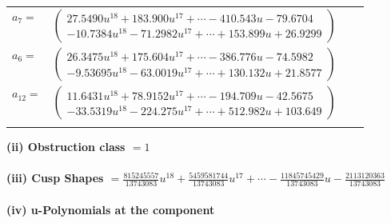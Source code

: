 \documentclass[1p]{elsarticle_modified}
\theoremstyle{definition}
\begin{document}
\begin{tabular}{m{7pt} m{180pt} m{7pt} m{180pt} }
\flushright $a_{7}=$&$\begin{pmatrix}27.5490 u^{18}+183.900 u^{17}+\cdots-410.543 u-79.6704\\-10.7384 u^{18}-71.2982 u^{17}+\cdots+153.899 u+26.9299\end{pmatrix}$ \\
\flushright $a_{6}=$&$\begin{pmatrix}26.3475 u^{18}+175.604 u^{17}+\cdots-386.776 u-74.5982\\-9.53695 u^{18}-63.0019 u^{17}+\cdots+130.132 u+21.8577\end{pmatrix}$ \\
\flushright $a_{12}=$&$\begin{pmatrix}11.6431 u^{18}+78.9152 u^{17}+\cdots-194.709 u-42.5675\\-33.5319 u^{18}-224.275 u^{17}+\cdots+512.982 u+103.649\end{pmatrix}$\\&\end{tabular}
\flushleft \textbf{(ii) Obstruction class $= 1$}\\~\\
\flushleft \textbf{(iii) Cusp Shapes $= \frac{815245557}{13743083} u^{18}+\frac{5459581744}{13743083} u^{17}+\cdots-\frac{11845745429}{13743083} u-\frac{2113120363}{13743083}$}\\~\\
\newpage\renewcommand{\arraystretch}{1}
\flushleft \textbf{(iv) u-Polynomials at the component}\newline \\
\end{document}

